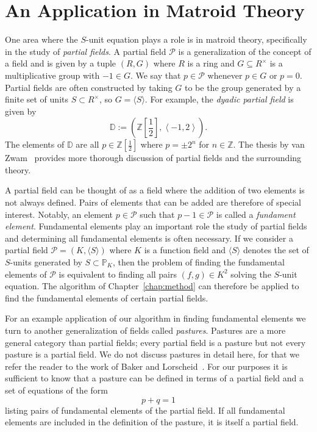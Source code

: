\section{An Application in Matroid Theory}%
\label{sec:an-application-in-matroid-theory}

One area where the \(S\)-unit equation plays a role is in matroid theory, specifically in the study of \textit{partial fields}. A partial field \(\mathcal{P}\) is a generalization of the concept of a field and is given by a tuple \((R, G)\) where \(R\) is a ring and \(G \subseteq R^{\times}\) is a multiplicative group with \(-1 \in G\). We say that \(p \in \mathcal{P}\) whenever \(p \in G\) or \(p = 0\). Partial fields are often constructed by taking \(G\) to be the group generated by a finite set of units \(S \subset R^{\times}\), so \(G = \langle S \rangle\). For example, the \textit{dyadic partial field} is given by
\[\mathbb{D} := \left( \mathbb{Z} \left[ \frac{1}{2} \right], \left\langle -1, 2 \right\rangle \right).\]
The elements of \(\mathbb{D}\) are all \(p \in \mathbb{Z} \left[ \frac{1}{2} \right]\) where \(p = \pm 2^{n}\) for \(n \in \mathbb{Z}\). The thesis by van Zwam~\cite{zwam-2009-partial-fields-in} provides more thorough discussion of partial fields and the surrounding theory.

A partial field can be thought of as a field where the addition of two elements is not always defined. Pairs of elements that can be added are therefore of special interest. Notably, an element \(p \in \mathcal{P}\) such that \(p - 1 \in \mathcal{P}\) is called a \textit{fundament element}. Fundamental elements play an important role the study of partial fields and determining all fundamental elements is often necessary. If we consider a partial field \(\mathcal{P} = (K, \langle S \rangle)\) where \(K\) is a function field and \(\langle S \rangle\) denotes the set of \(S\)-units generated by \(S \subset \mathbb{P}_{K}\), then the problem of finding the fundamental elements of \(\mathcal{P}\) is equivalent to finding all pairs \((f, g) \in K^{2}\) solving the \(S\)-unit equation. The algorithm of Chapter~\ref{chap:method} can therefore be applied to find the fundamental elements of certain partial fields.

For an example application of our algorithm in finding fundamental elements we turn to another generalization of fields called \textit{pastures}. Pastures are a more general category than partial fields; every partial field is a pasture but not every pasture is a partial field. We do not discuss pastures in detail here, for that we refer the reader to the work of Baker and Lorscheid~\cite{baker-2020-foundations-of-matroids}.  For our purposes it is sufficient to know that a pasture can be defined in terms of a partial field and a set of equations of the form
\[p + q = 1\]
listing pairs of fundamental elements of the partial field. If all fundamental elements are included in the definition of the pasture, it is itself a partial field.

